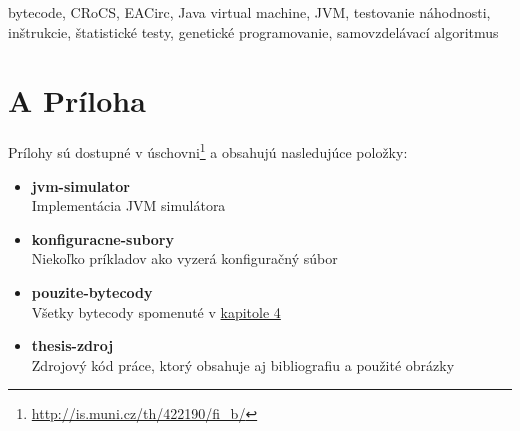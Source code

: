 \documentclass[12pt,twoside]{fithesis2}
\renewcommand{\_}{\leavevmode \kern0.0em\vbox{\hrule width0.4em}}
\newcommand{\squarebullet}{\textcolor{black}{\raisebox{0.15em}{\rule{4pt}{4pt}}}}
\newenvironment{myItemize}{
  \begin{itemize}[leftmargin=2em,rightmargin=1em,itemsep=0.75\parskip,parsep=0em,topsep=0em,partopsep=0em]
  \renewcommand{\labelitemi}{\squarebullet}
  \renewcommand{\labelitemii}{$\diamond$}
}{
  \end{itemize}
}
\begin{document}
\newpage\null\thispagestyle{empty}\newpage

\begin{ThesisKeyWords}
bytecode, CRoCS, EACirc, Java virtual machine, JVM, testovanie náhodnosti, inštrukcie, štatistické testy, genetické programovanie, samovzdelávací algoritmus
\end{ThesisKeyWords}
\newpage\null\thispagestyle{empty}\newpage



\MainMatter
\tableofcontents
\newpage\null\thispagestyle{empty}\newpage


\newpage\null\thispagestyle{empty}\newpage





\newpage\null\thispagestyle{empty}\newpage

\appendix

\nocite{*}
\printbibliography[title={Bibliografia}]

\chapter*{A Príloha}
\label{chap:attachments}

Prílohy sú dostupné v úschovni\footnote{\url{http://is.muni.cz/th/422190/fi_b/}} a obsahujú nasledujúce položky:
\begin{myItemize}
	\item \textbf{jvm-simulator}\\Implementácia JVM simulátora
	\item \textbf{konfiguracne-subory}\\Niekoľko príkladov ako vyzerá konfiguračný súbor
	\item \textbf{pouzite-bytecody}\\Všetky bytecody spomenuté v \hyperref[chap:experiments]{kapitole 4}
	\item \textbf{thesis-zdroj}\\Zdrojový kód práce, ktorý obsahuje aj bibliografiu a použité obrázky
\end{myItemize}
\end{document}
